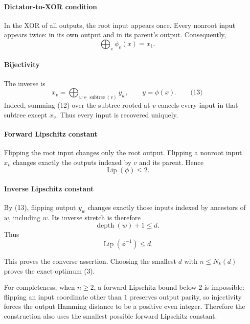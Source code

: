 \documentclass[
  11pt,
  a4paper,
]{article}
\begin{document}
\paragraph{Dictator-to-XOR condition}\label{dictator-to-xor-condition}

In the XOR of all outputs, the root input appears once. Every nonroot
input appears twice: in its own output and in its parent's output.
Consequently, \[
\bigoplus_v\phi_v(x)=x_1.
\]

\paragraph{Bijectivity}\label{bijectivity}

The inverse is \[
x_v
=
\bigoplus_{w\in\operatorname{subtree}(v)}y_w,
\qquad y=\phi(x).                                    \qquad\text{(13)}
\] Indeed, summing (12) over the subtree rooted at \(v\) cancels every
input in that subtree except \(x_v\). Thus every input is recovered
uniquely.

\paragraph{Forward Lipschitz constant}\label{forward-lipschitz-constant}

Flipping the root input changes only the root output. Flipping a nonroot
input \(x_v\) changes exactly the outputs indexed by \(v\) and its
parent. Hence \[
\operatorname{Lip}(\phi)\le2.
\]

\paragraph{Inverse Lipschitz constant}\label{inverse-lipschitz-constant}

By (13), flipping output \(y_w\) changes exactly those inputs indexed by
ancestors of \(w\), including \(w\). Its inverse stretch is therefore \[
\operatorname{depth}(w)+1\le d.
\] Thus \[
\operatorname{Lip}(\phi^{-1})\le d.
\]

This proves the converse assertion. Choosing the smallest \(d\) with
\(n\le N_k(d)\) proves the exact optimum (3).

For completeness, when \(n\ge2\), a forward Lipschitz bound below \(2\)
is impossible: flipping an input coordinate other than \(1\) preserves
output parity, so injectivity forces the output Hamming distance to be a
positive even integer. Therefore the construction also uses the smallest
possible forward Lipschitz constant.
\end{document}
